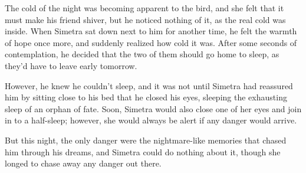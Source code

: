 The cold of the night was becoming apparent to the bird, and she felt that it must make his friend shiver, but he noticed nothing of it, as the real cold was inside. When Simetra sat down next to him for another time, he felt the warmth of hope once more, and suddenly realized how cold it was. After some seconds of contemplation, he decided that the two of them should go home to sleep, as they'd have to leave early tomorrow.

However, he knew he couldn't sleep, and it was not until Simetra had reassured him by sitting close to his bed that he closed his eyes, sleeping the exhausting sleep of an orphan of fate.
Soon, Simetra would also close one of her eyes and join in to a half-sleep; however, she would always be alert if any danger would arrive.

But this night, the only danger were the nightmare-like memories that chased him through his dreams, and Simetra could do nothing about it, though she longed to chase away any danger out there.
